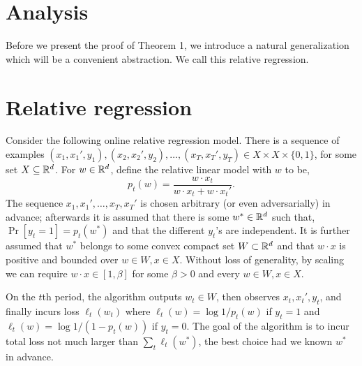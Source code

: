 \documentclass{article}
\begin{document}




\vskip 0.3in


\section{Analysis}

Before we present the proof of Theorem 1, we introduce a natural generalization which will be a convenient abstraction.  We call this relative regression.

\section{Relative regression}

Consider the following online relative regression model.  There is a sequence of examples $(x_1,x_1',y_1),(x_2,x_2',y_2),\ldots,(x_T,x_T',y_T) \in X \times X \times \{0,1\}$, for some set $X \subseteq \mathbb{R}^d$.  For $w \in \mathbb{R}^d$, define the relative linear model with $w$ to be,
$$p_t(w) = \frac{w \cdot x_t}{w \cdot x_t + w \cdot x_t'}.$$
The sequence $x_1,x_1',\ldots,x_T,x_T'$ is chosen arbitrary (or even adversarially) in advance; afterwards it is assumed that there is some $w^*\in \mathbb{R}^d$ such that, $\Pr[y_t=1]=p_t(w^*)$ and that the different $y_t$'s are independent.  It is further assumed that $w^*$ belongs to some convex compact set $W \subset \mathbb{R}^d$ and that $w \cdot x$ is positive and bounded over $w \in W,x\in X$.  Without loss of generality, by scaling we can require $w\cdot x \in [1,\beta]$ for some $\beta>0$ and every $w \in W,x\in X$.

On the $t$th period, the algorithm outputs $w_t \in W$, then observes $x_t,x_t',y_t$, and finally incurs loss $\ell_t(w_t)$ where $\ell_t(w)=\log 1/p_t(w)$ if $y_t=1$ and $\ell_t(w)=\log 1/(1-p_t(w))$ if $y_t=0$.  The goal of the algorithm is to incur total loss not much larger than $\sum_t \ell_t(w^*)$, the best choice had we known $w^*$ in advance.  
\end{document}

